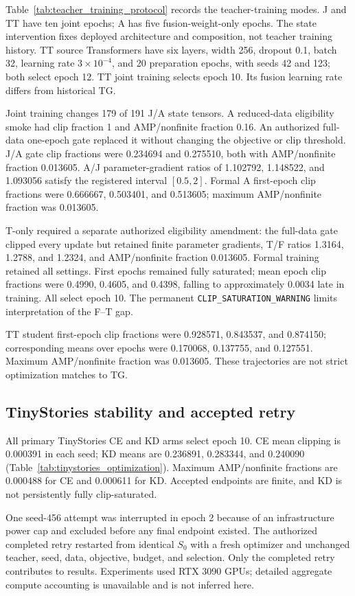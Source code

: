 Table~\ref{tab:teacher_training_protocol} records the teacher-training modes. J and TT have ten joint epochs; A has five fusion-weight-only epochs. The state intervention fixes deployed architecture and composition, not teacher training history. TT source Transformers have six layers, width 256, dropout 0.1, batch 32, learning rate $3\times10^{-4}$, and 20 preparation epochs, with seeds 42 and 123; both select epoch 12. TT joint training selects epoch 10. Its fusion learning rate differs from historical TG.


Joint training changes 179 of 191 J/A state tensors. A reduced-data eligibility smoke had clip fraction 1 and AMP/nonfinite fraction 0.16. An authorized full-data one-epoch gate replaced it without changing the objective or clip threshold. J/A gate clip fractions were 0.234694 and 0.275510, both with AMP/nonfinite fraction 0.013605. A/J parameter-gradient ratios of 1.102792, 1.148522, and 1.093056 satisfy the registered interval $[0.5,2]$. Formal A first-epoch clip fractions were 0.666667, 0.503401, and 0.513605; maximum AMP/nonfinite fraction was 0.013605.

T-only required a separate authorized eligibility amendment: the full-data gate clipped every update but retained finite parameter gradients, T/F ratios 1.3164, 1.2788, and 1.2324, and AMP/nonfinite fraction 0.013605. Formal training retained all settings. First epochs remained fully saturated; mean epoch clip fractions were 0.4990, 0.4605, and 0.4398, falling to approximately 0.0034 late in training. All select epoch 10. The permanent \texttt{CLIP\_SATURATION\_WARNING} limits interpretation of the F--T gap.

TT student first-epoch clip fractions were 0.928571, 0.843537, and 0.874150; corresponding means over epochs were 0.170068, 0.137755, and 0.127551. Maximum AMP/nonfinite fraction was 0.013605. These trajectories are not strict optimization matches to TG.

\subsection{TinyStories stability and accepted retry}
All primary TinyStories CE and KD arms select epoch 10. CE mean clipping is 0.000391 in each seed; KD means are 0.236891, 0.283344, and 0.240090 (Table~\ref{tab:tinystories_optimization}). Maximum AMP/nonfinite fractions are 0.000488 for CE and 0.000611 for KD. Accepted endpoints are finite, and KD is not persistently fully clip-saturated.

One seed-456 attempt was interrupted in epoch 2 because of an infrastructure power cap and excluded before any final endpoint existed. The authorized completed retry restarted from identical $S_0$ with a fresh optimizer and unchanged teacher, seed, data, objective, budget, and selection. Only the completed retry contributes to results. Experiments used RTX 3090 GPUs; detailed aggregate compute accounting is unavailable and is not inferred here.

